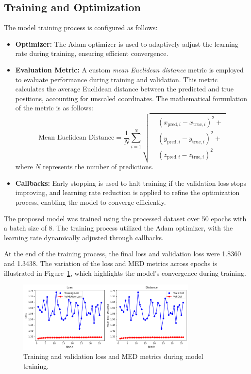 \subsection{Training and Optimization}
The model training process is configured as follows:
\begin{itemize}
    \item \textbf{Optimizer:} The Adam optimizer is used to adaptively adjust the learning rate during training, ensuring efficient convergence.
    \item \textbf{Evaluation Metric:} A custom \textit{mean Euclidean distance} metric is employed to evaluate performance during training and validation. This metric calculates the average Euclidean distance between the predicted and true positions, accounting for unscaled coordinates. The mathematical formulation of the metric is as follows:
    \[
\text{Mean Euclidean Distance} = 
\frac{1}{N} \sum_{i=1}^N 
\sqrt{
\begin{aligned}
    &(x_{\text{pred}, i} - x_{\text{true}, i})^2 + \\
    &(y_{\text{pred}, i} - y_{\text{true}, i})^2 + \\
    &(z_{\text{pred}, i} - z_{\text{true}, i})^2
\end{aligned}
}
\]
    where \(N\) represents the number of predictions.
    
    
    \item \textbf{Callbacks:} Early stopping is used to halt training if the validation loss stops improving, and learning rate reduction is applied to refine the optimization process, enabling the model to converge efficiently.
\end{itemize}

The proposed model was trained using the processed dataset over 50 epochs with a batch size of 8. The training process utilized the Adam optimizer, with the learning rate dynamically adjusted through callbacks. 

At the end of the training process, the final loss and validation loss were 1.8360 and 1.3438.
The variation of the loss and MED metrics across epochs is illustrated in Figure~\ref{fig:loss_MED_metrics}, which highlights the model's convergence during training.
    
\begin{figure}[H]
    \centering
    \includegraphics[width=0.8\textwidth]{Imgs/orogin_model.png}
    \caption{Training and validation loss and MED metrics during model training.}
    \label{fig:loss_MED_metrics}
\end{figure}

